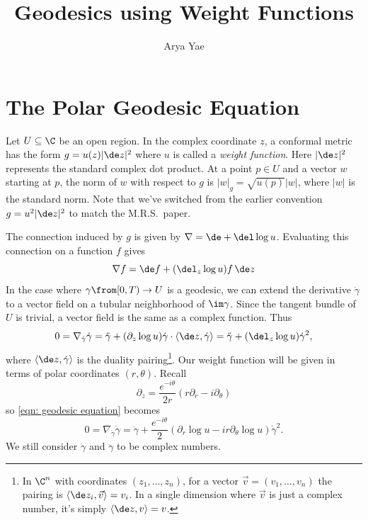 \documentclass{article}
\title{Geodesics using Weight Functions}
\author{Arya Yae}
\date{}
\begin{document}
\maketitle

\section*{The Polar Geodesic Equation}
Let $U\subseteq\C$ be an open region.  In the complex coordinate $z$, a conformal metric has the form $g=u(z)|\de z|^2$ where $u$ is called a \emph{weight function}.  Here $|\de z|^2$ represents the standard complex dot product.  At a point $p\in U$ and a vector $w$ starting at $p$, the norm of $w$ with respect to $g$ is $|w|_g=\sqrt{u(p)}|w|$, where $|w|$ is the standard norm.  Note that we've switched from the earlier convention $g=u^2|\de z|^2$ to match the M.R.S.\ paper.

The connection induced by $g$ is given by $\nabla=\de+\del\log u$.  Evaluating this connection on a function $f$ gives
\begin{equation}
    \nabla f=\de f + (\del_z\log u)f\,\de z
\end{equation}
In the case where $\gamma\from[0,T)\to U$ is a geodesic, we can extend the derivative $\dot\gamma$ to a vector field on a tubular neighborhood of $\im\gamma$.  Since the tangent bundle of $U$ is trivial, a vector field is the same as a complex function.  Thus
\begin{equation}\label{eqn: geodesic equation}
    0=\nabla_{\dot\gamma}\dot\gamma=\ddot\gamma+(\partial_z\log u)\dot\gamma\cdot\langle\de z,\dot\gamma\rangle=\ddot\gamma+(\del_z\log u)\dot\gamma^2,
\end{equation}
where $\langle\de z,\dot\gamma\rangle$ is the duality pairing\footnote{
    In $\C^n$ with coordinates $(z_1,\dots,z_n)$, for a vector $\vec v=(v_1,\dots,v_n)$ the pairing is $\langle\de z_i,\vec v\rangle=v_i$.  In a single dimension where $\vec v$ is just a complex number, it's simply $\langle\de z,v\rangle=v$.
}.  Our weight function will be given in terms of polar coordinates $(r,\theta)$.  Recall
    $$\partial_z=\frac{e^{-i\theta}}{2r}(r\partial_r-i\partial_\theta)$$
so \eqref{eqn: geodesic equation} becomes
\begin{equation}\label{eqn: polar geodesic equation}
    0=\nabla_{\dot\gamma}\dot\gamma=\ddot\gamma+\frac{e^{-i\theta}}{2}(\partial_r\log u-ir\partial_\theta\log u)\dot\gamma^2.
\end{equation}
We still consider $\dot\gamma$ and $\ddot\gamma$ to be complex numbers.
\end{document}
